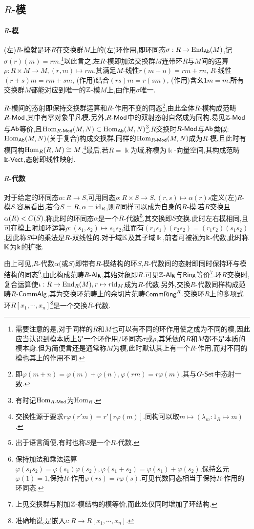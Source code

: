 \documentclass[11pt]{article} %
\begin{document}
\subsection{$R$-模}
\paragraph{$R$-模}
(左)$R$-模就是环$R$在交换群$M$上的(左)环作用,即环同态$\sigma:R\to \operatorname{End}_{\mathsf{Ab}}(M)$,记$\sigma(r)(m)=rm$.\footnote{需要注意的是,对于同样的$R$和$M$也可以有不同的环作用使之成为不同的模,因此应当认识到模本质上是一个环作用/环同态$\sigma$或$\rho$,其凭依的$R$和$M$都不是本质的模本身.但为简便言还是通常称$M$为模,此时默认其上有一个$R$-作用,而对不同的模也其上的作用不同.}以此言之,左$R$-模即加法交换群$M$连带环$R$与$M$间的运算$\rho:R\times M\to M, (r,m)\mapsto rm$,其满足$M$-线性$r(m+n)=rm+rn$, $R$-线性$(r+s)m=rm+sm$, (作用)结合$(rs)m=r(sm)$, (作用)含幺$1m=m$.所有交换群$M$都能对应到唯一的$\mathbb{Z}$-模$M$上,由作用$\sigma$唯一.

$R$-模间的态射即保持交换群运算和$R$-作用不变的同态\footnote{即$\varphi(m+n)=\varphi(m)+\varphi(n), \varphi(rm)=r\varphi(m)$,其与$G\textrm{-}\mathsf{Set}$中态射一致.},由此全体$R$-模构成范畴$R\textrm{-}\mathsf{Mod}$,其中有零对象平凡模.另外,$R\textrm{-}\mathsf{Mod}$中的双射态射自然成为同构.易见$\mathbb{Z}\textrm{-}\mathsf{Mod}$与$\mathsf{Ab}$等价,且$\operatorname{Hom}_{R\textrm{-}\mathsf{Mod}}(M,N)\subset\operatorname{Hom}_{\mathsf{Ab}}(M,N)$\footnote{有时记$\operatorname{Hom}_{R\textrm{-}\mathsf{Mod}}$为$\operatorname{Hom}_R$.}.$R$交换时$R\textrm{-}\mathsf{Mod}$与$\mathsf{Ab}$类似:$\operatorname{Hom}_{\mathsf{Ab}}(M,N)$(关于复合)构成交换群,同样的$\operatorname{Hom}_{R\textrm{-}\mathsf{Mod}}(M,N)$成为$R$-模,且此时有模同构$\operatorname{Hom}_{R}(R,M)\cong M$.\footnote{交换性源于要求$r\varphi(r'm)=r'[r\varphi(m)]$.同构可以取$m\mapsto (\lambda_m:1_R\mapsto m)$.}最后,若$R=\Bbbk$为域,称模为$\Bbbk$-向量空间,其构成范畴$\Bbbk\textrm{-}\mathsf{Vect}$,态射即线性映射.

\paragraph{$R$-代数}
对于给定的环同态$\alpha:R\to S$,可用同态$\rho:R\times S\to S, (r,s)\mapsto \alpha(r)s$定义(左)$R$-模$S$.容易看出,若令$S=R,\alpha=\mathrm{id}_R$,则$R$同样可以成为自身的$R$-模.若$R$交换且$\alpha(R)<C(S)$,称此时的环同态$\alpha$是一个$R$-代数\footnote{出于语言简便,有时也称$S$是一个$R$-代数.},其交换即$S$交换.此时左右模相同,且可在模上附加环运算$\rho:(s_1,s_2)\mapsto s_1s_2$,进而有$(r_1s_1)(r_2s_2)=(r_1r_2)(s_1s_2)$,因此称$S$中的乘法是$R$-双线性的.对于域$\mathbb{K}$及其子域$\Bbbk$,前者可被视为$\Bbbk$-代数,此时称$\mathbb{K}$为$\Bbbk$的扩张.

由上可见,$R$-代数$\alpha$(或$S$)即带有$R$-模结构的环$S$,$R$-代数间的态射即同时保持环与模结构的同态\footnote{保持加法和乘法运算$\varphi(s_1s_2)=\varphi(s_1)\varphi(s_2),\varphi(s_1+s_2)=\varphi(s_1)+\varphi(s_2)$,保持幺元$\varphi(1)=1$,保持$R$-作用$\varphi(rs)=r\varphi(s)$.可见代数同态相当于保持$R$-作用的环同态.},由此构成范畴$R\textrm{-}\mathsf{Alg}$,其始对象即$R$.可见$\mathbb{Z}\textrm{-}\mathsf{Alg}$与$\mathsf{Ring}$等价\footnote{上见交换群与附加$\mathbb{Z}$-模结构的模等价,而此处仅同时增加了环结构.}.环$R$交换时,复合运算使$\iota:R\to \operatorname{End}_{R}(M),r\mapsto r\mathrm{id}_M$成为$R$-代数.另外,交换$R$-代数同样构成范畴$R\textrm{-}\mathsf{Comm}\mathsf{Alg}$,其为交换环范畴上的余切片范畴$\mathsf{Comm}\mathsf{Ring}^{R}$.交换环$R$上的多项式环$R[x_1,\cdots,x_n]$\footnote{准确地说,是嵌入$\iota:R\to R[x_1,\cdots,x_n]$.}是一个交换$R$-代数.
\end{document}
